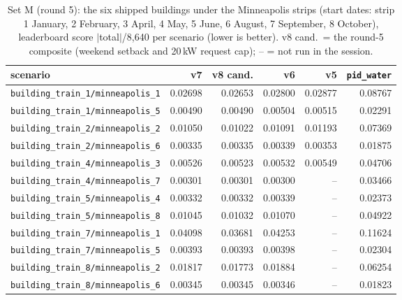 \begin{table}[!htbp]
\caption{Set M (round 5): the six shipped buildings under the Minneapolis strips (start dates: strip 1 January, 2 February, 3 April, 4 May, 5 June, 6 August, 7 September, 8 October), leaderboard score $|$total$|$/8,640 per scenario (lower is better). v8 cand.\ = the round-5 composite (weekend setback and 20\,kW request cap); -- = not run in the session.}
\label{tab:per_scenario_r5m}
\centering\scriptsize
\setlength{\tabcolsep}{4pt}
\begin{tabular}{lrrrrr}
\toprule
scenario & v7 & v8 cand. & v6 & v5 & \texttt{pid\_water} \\
\midrule
\texttt{building\_train\_1/minneapolis\_1} & 0.02698 & 0.02653 & 0.02800 & 0.02877 & 0.08767 \\
\texttt{building\_train\_1/minneapolis\_5} & 0.00490 & 0.00490 & 0.00504 & 0.00515 & 0.02291 \\
\texttt{building\_train\_2/minneapolis\_2} & 0.01050 & 0.01022 & 0.01091 & 0.01193 & 0.07369 \\
\texttt{building\_train\_2/minneapolis\_6} & 0.00335 & 0.00335 & 0.00339 & 0.00353 & 0.01875 \\
\texttt{building\_train\_4/minneapolis\_3} & 0.00526 & 0.00523 & 0.00532 & 0.00549 & 0.04706 \\
\texttt{building\_train\_4/minneapolis\_7} & 0.00301 & 0.00301 & 0.00300 & -- & 0.03466 \\
\texttt{building\_train\_5/minneapolis\_4} & 0.00332 & 0.00332 & 0.00339 & -- & 0.02373 \\
\texttt{building\_train\_5/minneapolis\_8} & 0.01045 & 0.01032 & 0.01070 & -- & 0.04922 \\
\texttt{building\_train\_7/minneapolis\_1} & 0.04098 & 0.03681 & 0.04253 & -- & 0.11624 \\
\texttt{building\_train\_7/minneapolis\_5} & 0.00393 & 0.00393 & 0.00398 & -- & 0.02304 \\
\texttt{building\_train\_8/minneapolis\_2} & 0.01817 & 0.01773 & 0.01884 & -- & 0.06254 \\
\texttt{building\_train\_8/minneapolis\_6} & 0.00345 & 0.00345 & 0.00346 & -- & 0.01823 \\
\bottomrule
\end{tabular}
\end{table}

